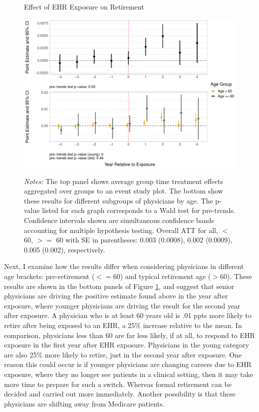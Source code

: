 \documentclass[12pt]{article}
\begin{document}
\begin{figure}[ht]
    \centering
    \captionsetup{width=.85\linewidth}
    \caption{Effect of EHR Exposure on Retirement}
    \includegraphics[scale=.6]{Objects/retire_plot.pdf}
    \label{fig:retirefirst}
    \vspace{2mm}
    \caption*{\footnotesize{\textit{Notes:} The top panel shows average group time treatment effects aggregated over groups to an event study plot. The bottom show these results for different subgroups of physicians by age. The p-value listed for each graph corresponds to a Wald test for pre-trends. Confidence intervals shown are simultaneous confidence bands accounting for multiple hypothesis testing. Overall ATT for all, $<$ 60, $>=$ 60 with SE in parentheses: 0.003 (0.0008), 0.002 (0.0009), 0.005 (0.002), respectively.}}
\end{figure}


Next, I examine how the results differ when considering physicians in different age brackets: pre-retirement ($<= 60$) and typical retirement age ($> 60$). These results are shown in the bottom panels of Figure \ref{fig:retirefirst}, and suggest that senior physicians are driving the positive estimate found above in the year after exposure, where younger physicians are driving the result for the second year after exposure. A physician who is at least 60 years old is .01 ppts more likely to retire after being exposed to an EHR, a 25\% increase relative to the mean. In comparison, physicians less than 60 are far less likely, if at all, to respond to EHR exposure in the first year after EHR exposure. Physicians in the young category are also 25\% more likely to retire, just in the second year after exposure. One reason this could occur is if younger physicians are changing careers due to EHR exposure, where they no longer see patients in a clinical setting, then it may take more time to prepare for such a switch.  Whereas formal retirement can be decided and carried out more immediately. Another possibility is that these physicians are shifting away from Medicare patients.    
\end{document}
